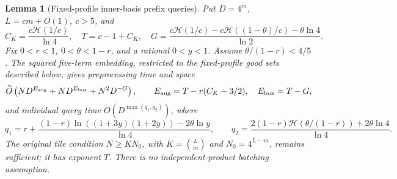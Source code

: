 \documentclass[11pt]{article}
\newtheorem{lemma}[theorem]{Lemma}
\newcommand{\softO}{\widetilde O}
\newcommand{\HH}{\mathcal H}
\begin{document}
\begin{lemma}[Fixed-profile inner-basis prefix queries]
\label{lem:five-profile}
Put $D=4^m$, $L=cm+O(1)$, $c>5$, and
\[
 C_K=\frac{c\HH(1/c)}{\ln4},\quad T=c-1+C_K,\quad
 G=\frac{c\HH(1/c)-c\HH((1-\theta)/c)-\theta\ln4}{\ln2}.
\]
Fix $0<r<1$, $0<\theta<1-r$, and a rational $0<y<1$.
Assume $\theta/(1-r)<4/5$. The squared five-term embedding,
restricted to the fixed-profile good sets described below, gives
preprocessing time and space
\[
 \softO\left(ND^{E_{\rm aug}}+ND^{E_{\rm box}}+N^2D^{-G}\right),
 \qquad
 E_{\rm aug}=T-r(C_K-3/2),\quad E_{\rm box}=T-G,
\]
and individual query time $\softO(D^{\max(q_1,q_2)})$, where
\[
 q_1=r+\frac{(1-r)\ln((1+3y)(1+2y))-2\theta\ln y}{\ln4},
 \qquad
 q_2=\frac{2(1-r)\HH(\theta/(1-r))+2\theta\ln4}{\ln4}.
\]
The original tile condition $N\ge KN_0$, with $K=\binom Lm$ and
$N_0=4^{L-m}$, remains sufficient; it has exponent $T$. There is no independent-product batching assumption.
\end{lemma}
\end{document}
